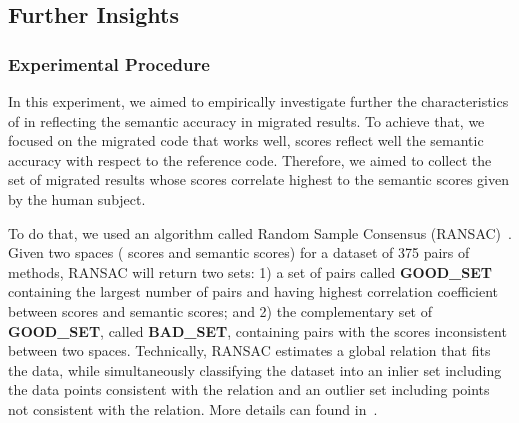 \subsection{Further Insights}

\subsubsection{Experimental Procedure}

In this experiment, we aimed to empirically investigate further the
characteristics of {\model} in reflecting the semantic accuracy in
migrated results. To achieve that, we focused on the migrated code
that {\model} works well, \ie {\model} scores reflect well the
semantic accuracy with respect to the reference code. Therefore, we
aimed to collect the set of migrated results whose {\model} scores
correlate highest to the semantic scores given by the human subject.

%


To do that, we used an algorithm called Random Sample Consensus
(RANSAC)~\cite{Fischler:1981:RSC:358669.358692}. Given two spaces
({\model} scores and semantic scores) for a dataset of 375 pairs of
methods, RANSAC will return two sets: 1) a set of pairs called {\bf
  GOOD\_SET} containing the largest number of pairs and having highest
correlation coefficient between {\model} scores and semantic scores;
and 2) the complementary set of {\bf GOOD\_SET}, called {\bf
  BAD\_SET}, containing pairs with the scores inconsistent between two
spaces. Technically, RANSAC estimates a global relation that fits the
data, while simultaneously classifying the dataset into an inlier set
including the data points consistent with the relation and an outlier
set including points not consistent with the relation. More details
can found in~\cite{Fischler:1981:RSC:358669.358692}.

